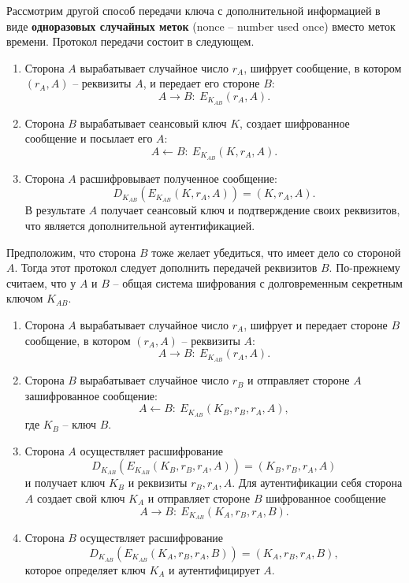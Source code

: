 \documentclass[10pt,a4paper]{book}
\begin{document}
Рассмотрим другой способ передачи ключа с дополнительной информацией в виде \textbf{одноразовых случайных меток} (nonce -- number used once) вместо меток времени. Протокол передачи состоит в следующем.

\begin{enumerate}
    \item Сторона $A$ вырабатывает случайное число $r_A$, шифрует сообщение, в котором  $(r_A, A)$ -- реквизиты $A$, и передает его стороне $B$:
            \[ A \rightarrow B: ~ E_{K_{AB}}(r_A, A). \]
    \item Сторона $B$ вырабатывает сеансовый ключ $K$, создает шифрованное сообщение и посылает его $A$:
            \[ A \leftarrow B: ~ E_{K_{AB}}(K, r_A, A). \]
    \item Сторона $A$ расшифровывает полученное сообщение:
            \[ D_{K_{AB}}( E_{K_{AB}}( K, r_A, A)) = (K, r_A, A). \]
        В результате $A$ получает сеансовый ключ и подтверждение своих реквизитов, что является дополнительной аутентификацией.
\end{enumerate}

Предположим, что сторона $B$ тоже желает убедиться, что имеет дело со стороной $A$. Тогда этот протокол следует дополнить передачей реквизитов $B$. По-прежнему считаем, что у $A$ и $B$ -- общая система шифрования с долговременным секретным ключом $K_{AB}$.

\begin{enumerate}
    \item Сторона $A$ вырабатывает случайное число $r_A$, шифрует и передает стороне $B$ сообщение, в котором  $(r_A, A)$ -- реквизиты $A$:
            \[ A \rightarrow B: ~ E_{K_{AB}}(r_A, A). \]
    \item Сторона $B$ вырабатывает случайное число $r_B$ и отправляет стороне $A$ зашифрованное сообщение:
            \[ A \leftarrow B: ~ E_{K_{AB}}(K_B, r_B, r_A, A), \]
        где $K_B$ -- ключ $B$.
     \item Сторона $A$ осуществляет расшифрование
            \[ D_{K_{AB}}(E_{K_{AB}}(K_B, r_B, r_A, A)) = (K_B, r_B, r_A, A) \]
        и получает ключ $K_B$ и реквизиты $r_B, r_A, A$. Для аутентификации себя сторона $A$ создает свой ключ $K_A$ и отправляет стороне $B$ шифрованное сообщение
            \[ A \rightarrow B: ~ E_{K_{AB}}(K_A, r_B, r_A, B). \]
     \item Сторона $B$ осуществляет расшифрование
            \[ D_{K_{AB}}(E_{K_{AB}}(K_A, r_B, r_A, B)) = (K_A, r_B, r_A, B), \]
        которое определяет ключ $K_A$ и аутентифицирует $A$.
\end{enumerate}
\end{document}
